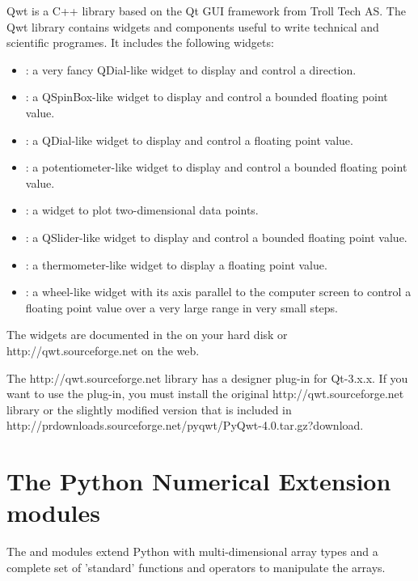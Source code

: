 \documentclass{manual}
\newcommand{\Qwt}{\ulink{Qwt}
  {http://qwt.sourceforge.net}}
\newcommand{\PyQwtTarGz}{\ulink{PyQwt-4.0.tar.gz}
  {http://prdownloads.sourceforge.net/pyqwt/PyQwt-4.0.tar.gz?download}}
\begin{document}
Qwt is a C++ library based on the Qt GUI framework from Troll Tech AS.
The Qwt library contains widgets and components useful to write technical
and scientific programes.
It includes the following widgets:
\begin{itemize}
  \item
    : a very fancy QDial-like widget to display and
    control a direction.
  \item
    : a QSpinBox-like widget to display and control
    a bounded floating point value.
  \item
    : a QDial-like widget to display and control a
    floating point value.
  \item
    : a potentiometer-like widget to display and control
    a bounded floating point value.
  \item
    : a widget to plot two-dimensional data points.
  \item
    : a QSlider-like widget to display and control a
    bounded floating point value.
  \item
    : a thermometer-like widget to display a floating
    point value. 
  \item
    : a wheel-like widget with its axis parallel to
    the computer screen to control a floating point value over a very
    large range in very small steps.
\end{itemize}
The widgets are documented in the
on your hard disk or \Qwt{} on the web.

\begin{notice}[note]
  The \Qwt{} library has a designer plug-in for Qt-3.x.x.  If you want to use
  the plug-in, you must install the original \Qwt{} library or the slightly
  modified version that is included in \PyQwtTarGz{}.
\end{notice}


\section{The Python Numerical Extension modules \label{numeric-intro}}

The 
and 
modules extend Python with multi-dimensional array types and a complete
set of 'standard' functions and operators to manipulate the arrays.
\end{document}
